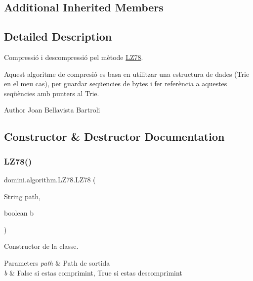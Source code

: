 \subsection*{Additional Inherited Members}


\subsection{Detailed Description}
Compressió i descompressió pel mètode \hyperlink{classdomini_1_1algorithm_1_1LZ78}{L\+Z78}. 

Aquest algoritme de compresió es basa en utilitzar una estructura de dades (Trie en el meu cas), per guardar seqüencies de bytes i fer referència a aquestes seqüències amb punters al Trie.

\begin{DoxyAuthor}{Author}
Joan Bellavista Bartroli 
\end{DoxyAuthor}


\subsection{Constructor \& Destructor Documentation}
\mbox{\label{classdomini_1_1algorithm_1_1LZ78_a89c121da8ae75e24f1cf0d06530d0b89}} 
\subsubsection{\texorpdfstring{L\+Z78()}{LZ78()}\hspace{0.1cm}{\footnotesize\ttfamily [1/2]}}
{\footnotesize\ttfamily domini.\+algorithm.\+L\+Z78.\+L\+Z78 (\begin{DoxyParamCaption}\item[{String}]{path,  }\item[{boolean}]{b }\end{DoxyParamCaption})\hspace{0.3cm}{\ttfamily [inline]}}



Constructor de la classe. 


\begin{DoxyParams}{Parameters}
{\em path} & Path de sortida \\
\hline
{\em b} & False si estas comprimint, True si estas descomprimint \\
\hline
\end{DoxyParams}

